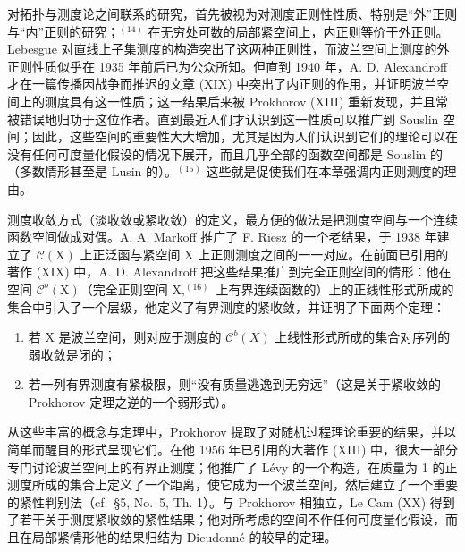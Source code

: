 
对拓扑与测度论之间联系的研究，首先被视为对测度正则性性质、特别是“外”正则与“内”正则的研究；\(^{(14)}\) 在无穷处可数的局部紧空间上，内正则等价于外正则。Lebesgue 对直线上子集测度的构造突出了这两种正则性，而波兰空间上测度的外正则性质似乎在 1935 年前后已为公众所知。但直到 1940 年，A. D. Alexandroff 才在一篇传播因战争而推迟的文章 (XIX) 中突出了内正则的作用，并证明波兰空间上的测度具有这一性质；这一结果后来被 Prokhorov (XIII) 重新发现，并且常被错误地归功于这位作者。直到最近人们才认识到这一性质可以推广到 Souslin 空间；因此，这些空间的重要性大大增加，尤其是因为人们认识到它们的理论可以在没有任何可度量化假设的情况下展开，而且几乎全部的函数空间都是 Souslin 的（多数情形甚至是 Lusin 的）。\(^{(15)}\) 这些就是促使我们在本章强调内正则测度的理由。

测度收敛方式（淡收敛或紧收敛）的定义，最方便的做法是把测度空间与一个连续函数空间做成对偶。A. A. Markoff 推广了 F. Riesz 的一个老结果，于 1938 年建立了 \(\mathcal{C}(\mathrm{X})\) 上正泛函与紧空间 X 上正则测度之间的一一对应。在前面已引用的著作 (XIX) 中，A. D. Alexandroff 把这些结果推广到完全正则空间的情形：他在空间 \(\mathcal{C}^b (\mathrm{X})\)（完全正则空间 \(\mathrm{X},^{(16)}\) 上有界连续函数的）上的正线性形式所成的集合中引入了一个层级，他定义了有界测度的紧收敛，并证明了下面两个定理：

\begin{enumerate}
\def\labelenumi{\alph{enumi})}
\item
  若 X 是波兰空间，则对应于测度的 \(\mathcal{C}^{b}(X)\) 上线性形式所成的集合对序列的弱收敛是闭的；
\item
  若一列有界测度有紧极限，则“没有质量逃逸到无穷远”（这是关于紧收敛的 Prokhorov 定理之逆的一个弱形式）。
\end{enumerate}

从这些丰富的概念与定理中，Prokhorov 提取了对随机过程理论重要的结果，并以简单而醒目的形式呈现它们。在他 1956 年已引用的大著作 (XIII) 中，很大一部分专门讨论波兰空间上的有界正测度；他推广了 Lévy 的一个构造，在质量为 1 的正测度所成的集合上定义了一个距离，使它成为一个波兰空间，然后建立了一个重要的紧性判别法（cf.~§5, No.~5, Th. 1）。与 Prokhorov 相独立，Le Cam (XX) 得到了若干关于测度紧收敛的紧性结果；他对所考虑的空间不作任何可度量化假设，而且在局部紧情形他的结果归结为 Dieudonné 的较早的定理。

